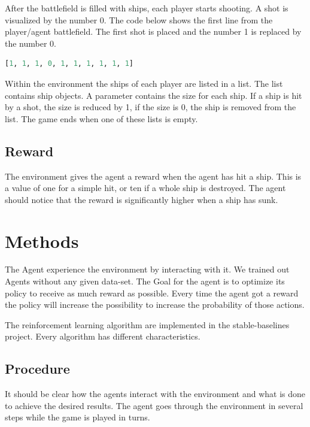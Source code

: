 \documentclass[sigconf]{acmart}
\begin{document}
\vspace{2.5mm}
After the battlefield is filled with ships, each player starts shooting.
A shot is visualized by the number 0. The code below shows the first line from the player/agent battlefield. The first shot is placed and the number 1 is replaced by the number 0.
\vspace{2.5mm}

\begin{lstlisting}[language=Python, caption=A line with a hit mark]
[1, 1, 1, 0, 1, 1, 1, 1, 1, 1]
\end{lstlisting}
\vspace{2.5mm}
Within the environment the ships of each player are listed in a list.
The list contains ship objects. A parameter contains the size for each ship. If a ship is hit by a shot, the size is reduced by 1, if the size is 0, the ship is removed from the list.
The game ends when one of these lists is empty.


\subsection{Reward}
The environment gives the agent a reward when the agent has hit a ship. 
This is a value of one for a simple hit, or ten if a whole ship is destroyed.
The agent should notice that the reward is significantly higher when a ship has sunk.


\vspace{2.5mm}
\section{Methods}
The Agent experience the environment by interacting with it. 
We trained out Agents without any given data-set. 
The Goal for the agent is to optimize its policy to receive as much reward as possible. 
Every time the agent got a reward the policy will increase the possibility to increase the probability of those actions.

The reinforcement learning algorithm are implemented in the stable-baselines project. Every algorithm has different characteristics.

\subsection{Procedure}
It should be clear how the agents interact with the environment and what is done to achieve the desired results.
The agent goes through the environment in several steps while the game is played in turns.
\end{document}
